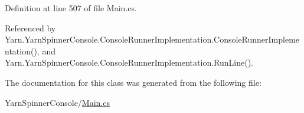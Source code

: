 Definition at line 507 of file Main.\-cs.



Referenced by Yarn.\-Yarn\-Spinner\-Console.\-Console\-Runner\-Implementation.\-Console\-Runner\-Implementation(), and Yarn.\-Yarn\-Spinner\-Console.\-Console\-Runner\-Implementation.\-Run\-Line().



The documentation for this class was generated from the following file\-:\begin{DoxyCompactItemize}
\item 
Yarn\-Spinner\-Console/\hyperlink{a00300}{Main.\-cs}\end{DoxyCompactItemize}
